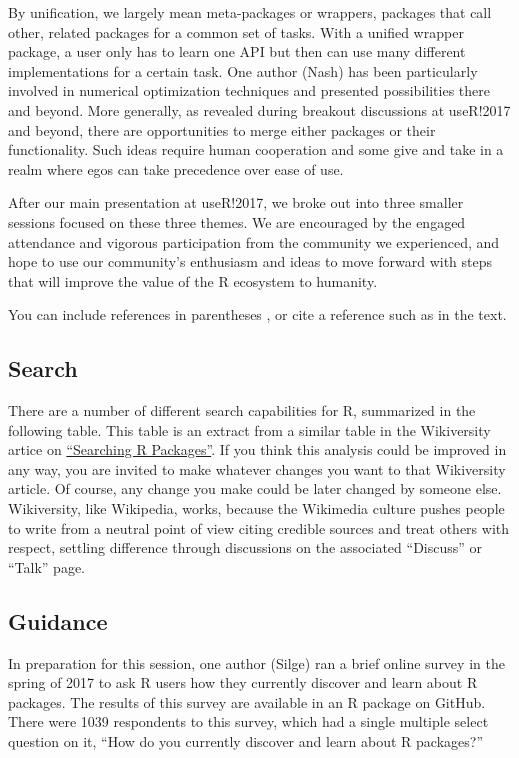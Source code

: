 By unification, we largely mean meta-packages or wrappers, packages that
call other, related packages for a common set of tasks. With a unified
wrapper package, a user only has to learn one API but then can use many
different implementations for a certain task. One author (Nash) has been
particularly involved in numerical optimization techniques and presented
possibilities there and beyond. More generally, as revealed during
breakout discussions at useR!2017 and beyond, there are opportunities to
merge either packages or their functionality. Such ideas require human
cooperation and some give and take in a realm where egos can take
precedence over ease of use.

After our main presentation at useR!2017, we broke out into three
smaller sessions focused on these three themes. We are encouraged by the
engaged attendance and vigorous participation from the community we
experienced, and hope to use our community's enthusiasm and ideas to
move forward with steps that will improve the value of the R ecosystem
to humanity.

You can include references in parentheses \citep{R}, or cite a reference
such as \citet{R} in the text.

\hypertarget{search}{%
\subsection{Search}\label{search}}

There are a number of different search capabilities for R, summarized in
the following table. This table is an extract from a similar table in
the Wikiversity artice on
\href{https://en.wikiversity.org/wiki/Searching_R_Packages}{``Searching
R Packages''}. If you think this analysis could be improved in any way,
you are invited to make whatever changes you want to that Wikiversity
article. Of course, any change you make could be later changed by
someone else. Wikiversity, like Wikipedia, works, because the Wikimedia
culture pushes people to write from a neutral point of view citing
credible sources and treat others with respect, settling difference
through discussions on the associated ``Discuss'' or ``Talk'' page.

\hypertarget{guidance}{%
\subsection{Guidance}\label{guidance}}

In preparation for this session, one author (Silge) ran a brief online
survey in the spring of 2017 to ask R users how they currently discover
and learn about R packages. The results of this survey are available in
an R package \citep{packagesurvey} on GitHub. There were 1039
respondents to this survey, which had a single multiple select question
on it, ``How do you currently discover and learn about R packages?''


